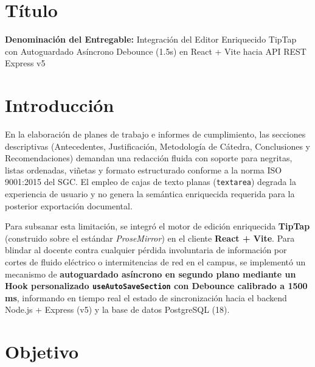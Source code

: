 \documentclass[12pt,a4paper]{article}
\begin{document}

\vspace{0.25cm}
\section{Título}
\textbf{Denominación del Entregable:} Integración del Editor Enriquecido TipTap con Autoguardado Asíncrono Debounce (1.5s) en React + Vite hacia API REST Express v5



\section{Introducción}
En la elaboración de planes de trabajo e informes de cumplimiento, las secciones descriptivas (Antecedentes, Justificación, Metodología de Cátedra, Conclusiones y Recomendaciones) demandan una redacción fluida con soporte para negritas, listas ordenadas, viñetas y formato estructurado conforme a la norma ISO 9001:2015 del SGC. El empleo de cajas de texto planas (\texttt{textarea}) degrada la experiencia de usuario y no genera la semántica enriquecida requerida para la posterior exportación documental.

Para subsanar esta limitación, se integró el motor de edición enriquecida \textbf{TipTap} (construido sobre el estándar \textit{ProseMirror}) en el cliente \textbf{React + Vite}. Para blindar al docente contra cualquier pérdida involuntaria de información por cortes de fluido eléctrico o intermitencias de red en el campus, se implementó un mecanismo de \textbf{autoguardado asíncrono en segundo plano mediante un Hook personalizado \texttt{useAutoSaveSection} con Debounce calibrado a 1500 ms}, informando en tiempo real el estado de sincronización hacia el backend Node.js + Express (v5) y la base de datos PostgreSQL (18).

\section{Objetivo}
\end{document}
